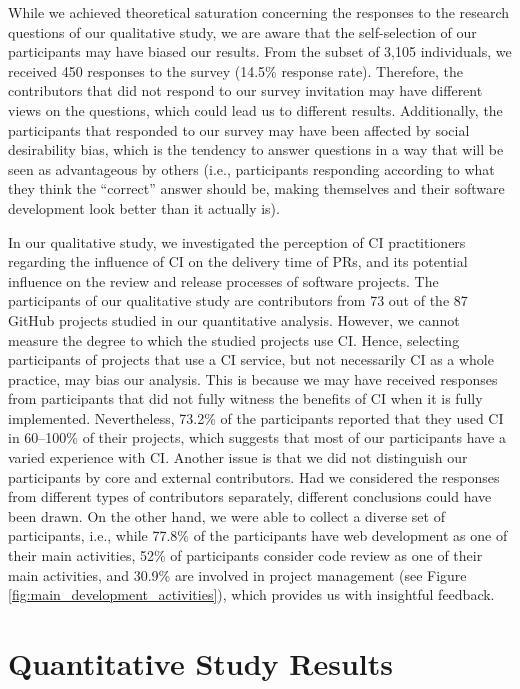 While we achieved theoretical saturation concerning the responses to the research questions of our qualitative study, we are aware that the self-selection of our participants may have biased our results. From the subset of 3,105 individuals, we received 450 responses to the survey (14.5\% response rate). Therefore, the contributors that did not respond to our survey invitation may have different views on the questions, which could lead us to different results.
Additionally, the participants that responded to our survey may have been affected by social desirability bias, which is the tendency to answer questions in a way that will be seen as advantageous by others (i.e., participants responding according to what they think the ``correct'' answer should be, making themselves and their software development look better than it actually is).

In our qualitative study, we investigated the perception of CI practitioners regarding the influence of CI on the delivery time of PRs, and its potential influence on the review and release processes of software projects. The participants of our qualitative study are contributors from 73 out of the 87 GitHub projects studied in our quantitative analysis. 
However, we cannot measure the degree to which the studied projects use CI. Hence, selecting participants of projects that use a CI service, but not necessarily CI as a whole practice, may bias our analysis. This is because we may have received responses from participants that did not fully witness the benefits of CI when it is fully implemented.  
Nevertheless, 73.2\% of the participants reported that they used CI in 60--100\% of their projects, which suggests that most of our participants have a varied experience with CI. Another issue is that we did not distinguish our participants by core and external contributors. 
Had we considered the responses from different types of contributors separately, different conclusions could have been drawn. On the other hand, we were able to collect a diverse set of participants, i.e., while 77.8\% of the participants have web development as one of their main activities, 52\% of participants consider code review as one of their main activities, and 30.9\% are involved in project management (see 
Figure \ref{fig:main_development_activities}), which provides us with insightful feedback.
\section{\textbf{Quantitative Study Results}}
\label{sec_quantitative_study_results}

